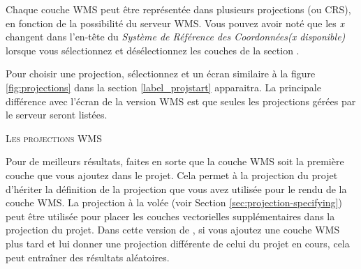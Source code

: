 Chaque couche WMS peut être représentée dans plusieurs projections (ou CRS), en fonction de la possibilité du serveur WMS. Vous pouvez avoir noté que les \textsl{x} changent dans l'en-tête du \textsl{Système de Référence des Coordonnées(x disponible)} lorsque vous sélectionnez et désélectionnez les couches de la section .

Pour choisir une projection, sélectionnez  et un écran similaire à la figure \ref{fig:projections} dans la section \ref{label_projstart} apparaitra. La principale différence avec l'écran de la version WMS est que seules les projections gérées par le serveur seront listées.

\begin{Tip}[ht]\caption{\textsc{Les projections WMS}}
Pour de meilleurs résultats, faites en sorte que la couche WMS soit la première couche que vous ajoutez dans le projet. Cela permet à la projection du projet d'hériter la définition de la projection que vous avez utilisée pour le rendu de la couche WMS. La projection à la volée (voir Section \ref{sec:projection-specifying}) peut être utilisée pour placer les couches vectorielles supplémentaires dans la projection du projet. Dans cette version  de \qg, si vous ajoutez une couche WMS plus tard et lui donner une projection différente de celui du projet en cours, cela peut entraîner des résultats aléatoires.
\end{Tip}


